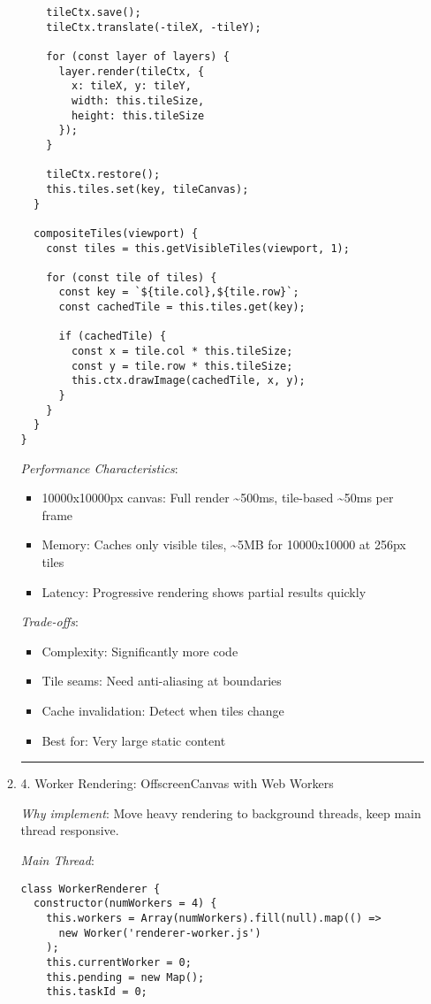 \documentclass[11pt]{article}
\begin{document}
\begin{enumerate}
\begin{enumerate}
\begin{verbatim}
    tileCtx.save();
    tileCtx.translate(-tileX, -tileY);
    
    for (const layer of layers) {
      layer.render(tileCtx, { 
        x: tileX, y: tileY, 
        width: this.tileSize, 
        height: this.tileSize 
      });
    }
    
    tileCtx.restore();
    this.tiles.set(key, tileCanvas);
  }
  
  compositeTiles(viewport) {
    const tiles = this.getVisibleTiles(viewport, 1);
    
    for (const tile of tiles) {
      const key = `${tile.col},${tile.row}`;
      const cachedTile = this.tiles.get(key);
      
      if (cachedTile) {
        const x = tile.col * this.tileSize;
        const y = tile.row * this.tileSize;
        this.ctx.drawImage(cachedTile, x, y);
      }
    }
  }
}
\end{verbatim}

\emph{Performance Characteristics}:
\begin{itemize}
\item 10000x10000px canvas: Full render \textasciitilde{}500ms, tile-based \textasciitilde{}50ms per frame
\item Memory: Caches only visible tiles, \textasciitilde{}5MB for 10000x10000 at 256px tiles
\item Latency: Progressive rendering shows partial results quickly
\end{itemize}

\emph{Trade-offs}:
\begin{itemize}
\item Complexity: Significantly more code
\item Tile seams: Need anti-aliasing at boundaries
\item Cache invalidation: Detect when tiles change
\item Best for: Very large static content
\end{itemize}

\noindent\rule{\textwidth}{0.5pt}
\item 4. Worker Rendering: OffscreenCanvas with Web Workers
\label{sec:org005b948}

\emph{Why implement}: Move heavy rendering to background threads, keep main thread responsive.

\emph{Main Thread}:
\begin{verbatim}
class WorkerRenderer {
  constructor(numWorkers = 4) {
    this.workers = Array(numWorkers).fill(null).map(() => 
      new Worker('renderer-worker.js')
    );
    this.currentWorker = 0;
    this.pending = new Map();
    this.taskId = 0;
    

\end{verbatim}
\end{enumerate}
\end{enumerate}
\end{document}
